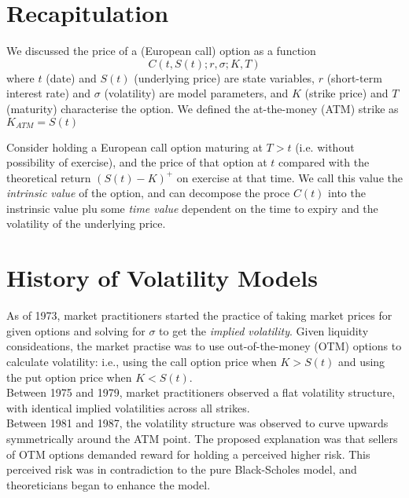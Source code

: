 \documentclass[11pt]{article}
\date{Lecture 4 (5 Feb. 2013)}
\begin{document}
{\small \maketitle}

\section{Recapitulation}
We discussed the price of a (European call) option as a function 
$$C(t, S(t); r, \sigma; K, T)$$
where $t$ (date) and $S(t)$ (underlying price) are state variables, $r$ (short-term interest rate) and $\sigma$ (volatility) are model parameters, and $K$ (strike price) and $T$ (maturity) characterise the option. We defined the at-the-money (ATM) strike as $K_{ATM} = S(t)$\\

\begin{remark}
Consider holding a European call option maturing at $T > t$ (i.e. without possibility of exercise), and the price of that option at $t$ compared with the theoretical return $\left(S(t) -K\right)^+$ on exercise at that time. We call this value  the {\em intrinsic value} of the option, and can decompose the proce $C(t)$ into the instrinsic value plu some {\em time value} dependent on the time to expiry and the volatility of the underlying price.
\end{remark}

\section{History of Volatility Models}

As of 1973, market practitioners started the practice of taking market prices for given options and solving for $\sigma$ to get the {\em implied volatility}. Given liquidity consideations, the market practise was to use out-of-the-money (OTM) options to calculate volatility: i.e., using the call option price when $K > S(t)$ and using the put option price when $K < S(t)$. \\

Between 1975 and 1979, market practitioners observed a flat volatility structure, with identical implied volatilities across all strikes. \\

Between 1981 and 1987, the volatility structure was observed to curve upwards symmetrically around the ATM point. The proposed explanation was that sellers of OTM options demanded reward for holding a perceived higher risk. This perceived risk was in contradiction to the pure Black-Scholes model, and theoreticians began to enhance the model. \\
\end{document}
